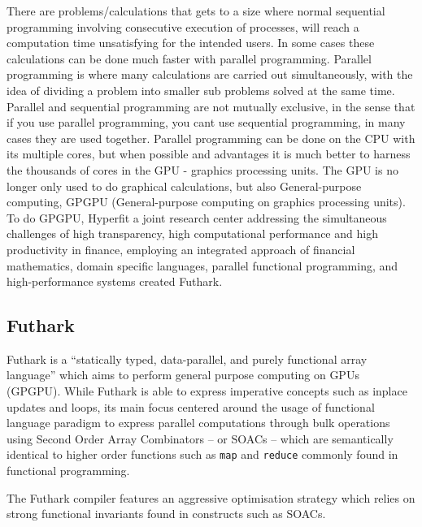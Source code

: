 \documentclass[11pt]{article}
\begin{document}
There are problems/calculations that gets to a size where normal sequential programming involving consecutive execution of processes, will reach a computation time unsatisfying for the intended users. In some cases these calculations can be done much faster with parallel programming. Parallel programming is where many calculations are carried out simultaneously, with the idea of dividing a problem into smaller sub problems solved at the same time. Parallel and sequential programming are not mutually exclusive, in the sense that if you use parallel programming, you cant use sequential programming, in many cases they are used together. Parallel programming can be done on the CPU with its multiple cores, but when possible and advantages it is much better to harness the thousands of cores in the GPU - graphics processing units. The GPU is no longer only used to do graphical calculations, but also General-purpose computing, GPGPU (General-purpose computing on graphics processing units). \\

To do GPGPU, Hyperfit a joint research center addressing the simultaneous challenges of high transparency, high computational performance and high productivity in finance, employing an integrated approach of financial mathematics, domain specific languages, parallel functional programming, and high-performance systems \cite{Hyperfit} created Futhark. 


\subsection{Futhark}

Futhark is a ``statically typed, data-parallel, and purely functional array language'' \cite{futharklang} which aims to perform
 general purpose computing on GPUs (GPGPU). While Futhark is able to express imperative concepts such as inplace updates and loops, its main focus centered around the usage of
 functional language paradigm to express parallel computations through bulk operations using Second Order Array Combinators
 -- or SOACs -- which are semantically identical to higher order functions such as \texttt{map} and \texttt{reduce} commonly found in functional programming.

The Futhark compiler features an aggressive optimisation strategy which relies on strong functional invariants found in constructs such as SOACs.

\end{document}
